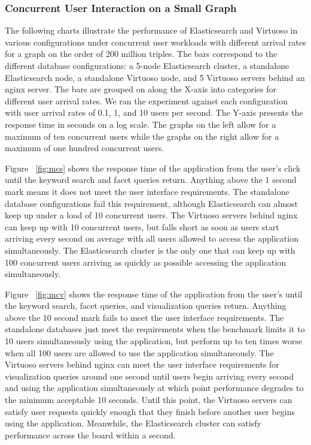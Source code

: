 \subsubsection{Concurrent User Interaction on a Small Graph} 
The following charts illustrate the performance of Elasticsearch and Virtuoso in various configurations under concurrent user workloads with different arrival rates for a graph on the order of 200 million triples.
The bars correspond to the different database configurations: a 5-node Elasticsearch cluster, a standalone Elasticsearch node, a standalone Virtuoso node, and 5 Virtuoso servers behind an nginx server.  
The bars are grouped on along the X-axis into categories for different user arrival rates.
We ran the experiment against each configuration with user arrival rates of 0.1, 1, and 10 users per second.
The Y-axis presents the response time in seconds on a log scale.  
The graphs on the left allow for a maximum of ten concurrent users while the graphs on the right allow for a maximum of one hundred concurrent users.  

Figure ~\ref{fig:mcs} shows the response time of the application from the user's click until the keyword search and facet queries return.  Anything above the 1 second mark means it does not meet the user interface requirements.  
The standalone database configurations fail this requirement, although Elasticsearch can almost keep up under a load of 10 concurrent users.
The Virtuoso servers behind nginx can keep up with 10 concurrent users, but falls short as soon as users start arriving every second on average with all users allowed to access the application simultaneously.
The Elasticsearch cluster is the only one that can keep up with 100 concurrent users arriving as quickly as possible accessing the application simultaneously.

Figure ~\ref{fig:mcv} shows the response time of the application from the user's until the keyword search, facet queries, and visualization queries return.  Anything above the 10 second mark fails to meet the user interface requirements.
The standalone databases just meet the requirements when the benchmark limits it to 10 users simultaneously using the application, but perform up to ten times worse when all 100 users are allowed to use the application simultaneously.
The Virtuoso servers behind nginx can meet the user interface requirements for visualization queries around one second until users begin arriving every second and using the application simultaneously at which point performance degrades to the minimum acceptable 10 seconds.
Until this point, the Virtuoso servers can satisfy user requests quickly enough that they finish before another user begins using the application. 
Meanwhile, the Elasticsearch cluster can satisfy performance across the board within a second.  

